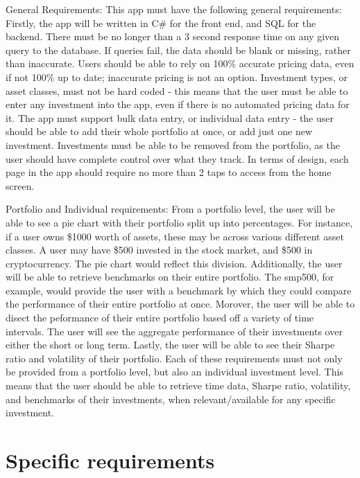 \documentclass[onecolumn, draftclsnofoot,10pt, compsoc]{IEEEtran}
\begin{document}
General Requirements:
This app must have the following general requirements: Firstly, the app will be written in C\# for the front end, and SQL for the backend. There must be no longer than a 3 second response time on any given query to the database. If queries fail, the data should be blank or missing, rather than inaccurate. Users should be able to rely on 100\% accurate pricing data, even if not 100\% up to date; inaccurate pricing is not an option. Investment types, or asset classes, must not be hard coded - this means that the user must be able to enter any investment into the app, even if there is no automated pricing data for it. The app must support bulk data entry, or individual data entry - the user should be able to add their whole portfolio at once, or add just one new investment. Investments must be able to be removed from the portfolio, as the user should have complete control over what they track. In terms of design, each page in the app should require no more than 2 taps to access from the home screen.

Portfolio and Individual requirements: From a portfolio level, the user will be able to see a pie chart with their portfolio split up into percentages. For instance, if a user owns \$1000 worth of assets, these may be across various different asset classes. A user may have \$500 invested in the stock market, and \$500 in cryptocurrency. The pie chart would reflect this division. Additionally, the user will be able to retrieve benchmarks on their entire portfolio. The smp500, for example, would provide the user with a benchmark by which they could compare the performance of their entire portfolio at once. Morover, the user will be able to disect the peformance of their entire portfolio based off a variety of time intervals. The user will see the aggregate performance of their investments over either the short or long term. Lastly, the user will be able to see their Sharpe ratio and volatility of their portfolio. Each of these requirements must not only be provided from a portfolio level, but also an individual investment level. This means that the user should be able to retrieve time data, Sharpe ratio, volatility, and benchmarks of their investments, when relevant/available for any specific investment.






\section{Specific requirements}
\end{document}
